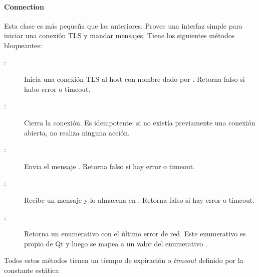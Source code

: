 \paragraph{Connection}
Esta clase es más pequeña que las anteriores. Provee una interfaz simple para iniciar una conexión TLS y mandar mensajes. Tiene los siguientes métodos bloqueantes:
\begin{description}
	\item[:] Inicia una conexión TLS al host con nombre dado por . Retorna falso si hubo error o timeout.
	\item[:] Cierra la conexión. Es idempotente: si no existía previamente una conexión abierta, no realiza ninguna acción.
	\item[:] Envia el mensaje . Retorna falso si hay error o timeout.
	\item[:] Recibe un mensaje y lo almacena en . Retorna falso si hay error o timeout.
	\item[:] Retorna un enumerativo con el último error de red. Este enumerativo es propio de Qt y luego se mapea a un valor del enumerativo .
\end{description}

Todos estos métodos tienen un tiempo de expiración o \emph{timeout} definido por la constante estática 


